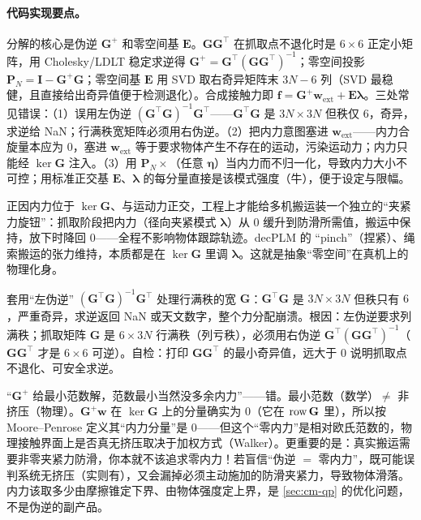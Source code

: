 \paragraph{代码实现要点。}
分解的核心是伪逆 $\mathbf{G}^{+}$ 和零空间基 $\mathbf{E}$。$\mathbf{G}\mathbf{G}^\top$ 在抓取点不退化时是 $6\times 6$ 正定小矩阵，用 Cholesky/LDLT 稳定求逆得 $\mathbf{G}^{+}=\mathbf{G}^\top(\mathbf{G}\mathbf{G}^\top)^{-1}$；零空间投影 $\mathbf{P}_N=\mathbf{I}-\mathbf{G}^{+}\mathbf{G}$；零空间基 $\mathbf{E}$ 用 SVD 取右奇异矩阵末 $3N-6$ 列（SVD 最稳健，且直接给出奇异值便于检测退化）。合成接触力即 $\mathbf{f}=\mathbf{G}^{+}\mathbf{w}_{\text{ext}}+\mathbf{E}\boldsymbol{\lambda}$。三处常见错误：（1）误用左伪逆 $(\mathbf{G}^\top\mathbf{G})^{-1}\mathbf{G}^\top$——$\mathbf{G}^\top\mathbf{G}$ 是 $3N\times 3N$ 但秩仅 $6$，奇异，求逆给 NaN；行满秩宽矩阵必须用右伪逆。（2）把内力意图塞进 $\mathbf{w}_{\text{ext}}$——内力合旋量本应为 $0$，塞进 $\mathbf{w}_{\text{ext}}$ 等于要求物体产生不存在的运动，污染运动力；内力只能经 $\ker\mathbf{G}$ 注入。（3）用 $\mathbf{P}_N\times$（任意 $\boldsymbol{\eta}$）当内力而不归一化，导致内力大小不可控；用标准正交基 $\mathbf{E}$、$\boldsymbol{\lambda}$ 的每分量直接是该模式强度（牛），便于设定与限幅。

\begin{insight}
正因内力位于 $\ker\mathbf{G}$、与运动力正交，工程上才能给多机搬运装一个独立的“夹紧力旋钮”：抓取阶段把内力（径向夹紧模式 $\boldsymbol{\lambda}$）从 $0$ 缓升到防滑所需值，搬运中保持，放下时降回 $0$——全程不影响物体跟踪轨迹。decPLM 的 “pinch”（捏紧）、绳索搬运的张力维持，本质都是在 $\ker\mathbf{G}$ 里调 $\boldsymbol{\lambda}$。这就是抽象“零空间”在真机上的物理化身。
\end{insight}

\begin{pitfall}
套用“左伪逆” $(\mathbf{G}^\top\mathbf{G})^{-1}\mathbf{G}^\top$ 处理行满秩的宽 $\mathbf{G}$：$\mathbf{G}^\top\mathbf{G}$ 是 $3N\times 3N$ 但秩只有 $6$，严重奇异，求逆返回 NaN 或天文数字，整个力分配崩溃。根因：左伪逆要求列满秩；抓取矩阵 $\mathbf{G}$ 是 $6\times 3N$ 行满秩（列亏秩），必须用右伪逆 $\mathbf{G}^\top(\mathbf{G}\mathbf{G}^\top)^{-1}$（$\mathbf{G}\mathbf{G}^\top$ 才是 $6\times 6$ 可逆）。自检：打印 $\mathbf{G}\mathbf{G}^\top$ 的最小奇异值，远大于 $0$ 说明抓取点不退化、可安全求逆。
\end{pitfall}

\begin{pitfall}
“$\mathbf{G}^{+}$ 给最小范数解，范数最小当然没多余内力”——错。最小范数（数学）$\ne$ 非挤压（物理）。$\mathbf{G}^{+}\mathbf{w}$ 在 $\ker\mathbf{G}$ 上的分量确实为 $0$（它在 $\operatorname{row}\mathbf{G}$ 里），所以按 Moore--Penrose 定义其“内力分量”是 $0$——但这个“零内力”是相对欧氏范数的，物理接触界面上是否真无挤压取决于加权方式（Walker）。更重要的是：真实搬运需要非零夹紧力防滑，你本就不该追求零内力！若盲信“伪逆 $=$ 零内力”，既可能误判系统无挤压（实则有），又会漏掉必须主动施加的防滑夹紧力，导致物体滑落。内力该取多少由摩擦锥定下界、由物体强度定上界，是 \cref{sec:cm-qp} 的优化问题，不是伪逆的副产品。
\end{pitfall}

